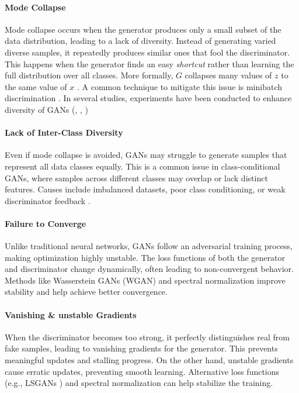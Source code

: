 \paragraph[Mode Collapse]{Mode Collapse}
Mode collapse occurs when the generator produces only a small subset of the data distribution, leading to a lack of diversity. Instead of generating varied diverse samples, it repeatedly produces similar ones that fool the discriminator. This happens when the generator finds an easy \textit{shortcut} rather than learning the full distribution over all classes. More formally, \(G\) collapses many values of \(z\) to the same value of \(x\) \cite{goodfellow2014generativeadversarialnetworks}. A common technique to mitigate this issue is minibatch discrimination \cite{salimans2016improvedtechniquestraininggans}. In several studies, experiments have been conducted to enhance diversity of GANs (\cite{Chang2024QDGenSampling}, \cite{Humayun2021MaGNET}, \cite{Humayun2022PolaritySampling}) %
\paragraph[Lack of Inter-Class Diversity]{Lack of Inter-Class Diversity}
Even if mode collapse is avoided, GANs may struggle to generate samples that represent all data classes equally. This is a common issue in class-conditional GANs, where samples across different classes may overlap or lack distinct features. Causes include imbalanced datasets, poor class conditioning, or weak discriminator feedback \cite{Odena201710.5555/3305890.3305954}.

\paragraph[Failure to Converge]{Failure to Converge}
Unlike traditional neural networks, GANs follow an adversarial training process, making optimization highly unstable. The loss functions of both the generator and discriminator change dynamically, often leading to non-convergent behavior. Methods like Wasserstein GANs (WGAN) \cite{arjovsky2017wassersteingan} and spectral normalization \cite{miyato2018spectralnormalizationgenerativeadversarial} improve stability and help achieve better convergence.

\paragraph[Vanishing & unstable Gradients]{Vanishing \& unstable Gradients}
When the discriminator becomes too strong, it perfectly distinguishes real from fake samples, leading to vanishing gradients for the generator. This prevents meaningful updates and stalling progress. On the other hand, unstable gradients cause erratic updates, preventing smooth learning. Alternative loss functions (e.g., LSGANs \cite{mao2017squaresgenerativeadversarialnetworks}) and spectral normalization can help stabilize the training.

